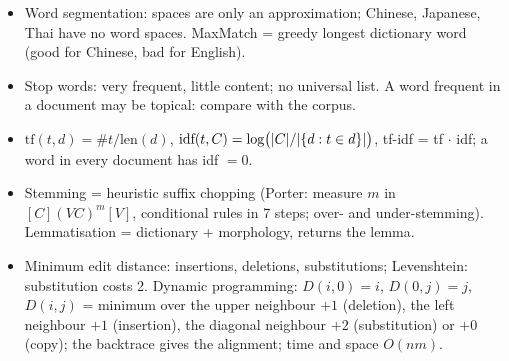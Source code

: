 \begin{nbsummary}
\begin{itemize}[nosep]
  \item Word segmentation: spaces are only an approximation; Chinese, Japanese, Thai have
        no word spaces. MaxMatch = greedy longest dictionary word (good for Chinese,
        bad for English).
  \item Stop words: very frequent, little content; no universal list. A word frequent in
        a document may be topical: compare with the corpus.
  \item $\text{tf}(t,d)=\#t/\text{len}(d)$,
        $\text{idf}(t,C)=\log\bigl(\lvert C\rvert/\lvert \{d: t\in d\}\rvert\bigr)$,
        tf-idf = tf $\cdot$ idf; a word in every document has idf $=0$.
  \item Stemming = heuristic suffix chopping (Porter: measure $m$ in $[C](VC)^m[V]$,
        conditional rules in 7 steps; over- and under-stemming). Lemmatisation =
        dictionary + morphology, returns the lemma.
  \item Minimum edit distance: insertions, deletions, substitutions; Levenshtein:
        substitution costs 2. Dynamic programming: $D(i,0)=i$, $D(0,j)=j$,
        $D(i,j)$ = minimum over the upper neighbour $+1$ (deletion), the left
        neighbour $+1$ (insertion), the diagonal neighbour $+2$ (substitution) or $+0$
        (copy); the backtrace gives the alignment; time and space $O(nm)$.
\end{itemize}
\end{nbsummary}
